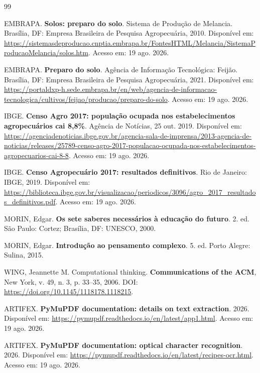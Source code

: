 \documentclass[12pt,a4paper]{article}
\begin{document}
\sloppy
\begin{thebibliography}{99}

EMBRAPA. \textbf{Solos: preparo do solo}. Sistema de Produção de Melancia. Brasília, DF: Empresa Brasileira de Pesquisa Agropecuária, 2010. Disponível em: \url{https://sistemasdeproducao.cnptia.embrapa.br/FontesHTML/Melancia/SistemaProducaoMelancia/solos.htm}. Acesso em: 19 ago. 2026.

EMBRAPA. \textbf{Preparo do solo}. Agência de Informação Tecnológica: Feijão. Brasília, DF: Empresa Brasileira de Pesquisa Agropecuária, 2021. Disponível em: \url{https://portaldxp-h.sede.embrapa.br/en/web/agencia-de-informacao-tecnologica/cultivos/feijao/producao/preparo-do-solo}. Acesso em: 19 ago. 2026.

IBGE. \textbf{Censo Agro 2017: população ocupada nos estabelecimentos agropecuários cai 8,8\%}. Agência de Notícias, 25 out. 2019. Disponível em: \url{https://agenciadenoticias.ibge.gov.br/agencia-sala-de-imprensa/2013-agencia-de-noticias/releases/25789-censo-agro-2017-populacao-ocupada-nos-estabelecimentos-agropecuarios-cai-8-8}. Acesso em: 19 ago. 2026.

IBGE. \textbf{Censo Agropecuário 2017: resultados definitivos}. Rio de Janeiro: IBGE, 2019. Disponível em: \url{https://biblioteca.ibge.gov.br/visualizacao/periodicos/3096/agro_2017_resultados_definitivos.pdf}. Acesso em: 19 ago. 2026.

MORIN, Edgar. \textbf{Os sete saberes necessários à educação do futuro}. 2. ed. São Paulo: Cortez; Brasília, DF: UNESCO, 2000.

MORIN, Edgar. \textbf{Introdução ao pensamento complexo}. 5. ed. Porto Alegre: Sulina, 2015.

WING, Jeannette M. Computational thinking. \textbf{Communications of the ACM}, New York, v. 49, n. 3, p. 33--35, 2006. DOI: \url{https://doi.org/10.1145/1118178.1118215}.

ARTIFEX. \textbf{PyMuPDF documentation: details on text extraction}. 2026. Disponível em: \url{https://pymupdf.readthedocs.io/en/latest/app1.html}. Acesso em: 19 ago. 2026.

ARTIFEX. \textbf{PyMuPDF documentation: optical character recognition}. 2026. Disponível em: \url{https://pymupdf.readthedocs.io/en/latest/recipes-ocr.html}. Acesso em: 19 ago. 2026.


\end{thebibliography}
\end{document}
